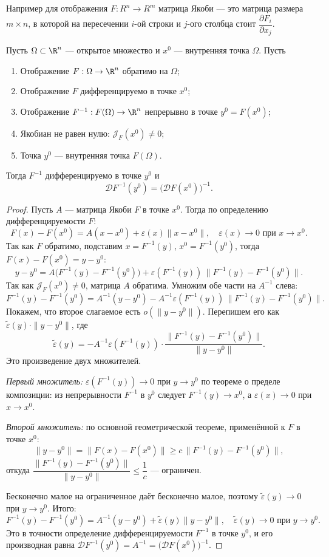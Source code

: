 \begin{note}
Например для отображения $F : R^n \to R^m$ матрица Якоби --- это матрица размера $m \times n$, в которой на пересечении $i$-ой строки и $j$-ого столбца стоит $\dfrac{\partial F_i}{\partial x_j}$.
\end{note}
\begin{theorem}
Пусть $\Omega \subset \R^n$ --- открытое множество и $x^0$ --- внутренняя точка $\Omega$. Пусть
\begin{enumerate}
  \item Отображение $F : \Omega \to \R^n$ обратимо на $\Omega$;
  \item Отображение $F$ дифференцируемо в точке $x^0$;
  \item Отображение $F^{-1} : F(\Omega) \to \R^n$ непрерывно в точке $y^0 = F(x^0)$;
  \item Якобиан не равен нулю: $\mathcal{J}_F(x^0) \neq 0$;
  \item Точка $y^0$ --- внутренняя точка $F(\Omega)$.
\end{enumerate}
Тогда $F^{-1}$ дифференцируемо в точке $y^0$ и
\[
  \mathcal{D}F^{-1}(y^0) = \bigl(\mathcal{D}F(x^0)\bigr)^{-1}.
\]
\begin{proof}
Пусть $A$ --- матрица Якоби $F$ в точке $x^0$. Тогда по определению
дифференцируемости $F$:
\[
  F(x) - F(x^0) = A(x - x^0) + \varepsilon(x)\|x - x^0\|,
  \quad \varepsilon(x) \to 0 \text{ при } x \to x^0.
\]
Так как $F$ обратимо, подставим $x = F^{-1}(y)$, $x^0 = F^{-1}(y^0)$,
тогда $F(x) - F(x^0) = y - y^0$:
\[
  y - y^0
  = A\bigl(F^{-1}(y) - F^{-1}(y^0)\bigr)
  + \varepsilon(F^{-1}(y))\,\|F^{-1}(y) - F^{-1}(y^0)\|.
\]
Так как $\mathcal{J}_F(x^0) \neq 0$, матрица $A$ обратима.
Умножим обе части на $A^{-1}$ слева:
\[
  F^{-1}(y) - F^{-1}(y^0)
  = A^{-1}(y - y^0)
  - A^{-1}\varepsilon(F^{-1}(y))\,\|F^{-1}(y) - F^{-1}(y^0)\|.
\]
Покажем, что второе слагаемое есть $o(\|y - y^0\|)$.
Перепишем его как $\tilde{\varepsilon}(y)\cdot\|y-y^0\|$, где
\[
  \tilde{\varepsilon}(y)
  = -A^{-1}\varepsilon(F^{-1}(y))\cdot
  \frac{\|F^{-1}(y) - F^{-1}(y^0)\|}{\|y - y^0\|}.
\]
Это произведение двух множителей.

\textit{Первый множитель:} $\varepsilon(F^{-1}(y)) \to 0$ при $y \to y^0$
по теореме о пределе композиции: из непрерывности $F^{-1}$ в $y^0$ следует
$F^{-1}(y) \to x^0$, а $\varepsilon(x) \to 0$ при $x \to x^0$.

\textit{Второй множитель:} по основной геометрической теореме,
применённой к $F$ в точке $x^0$:
\[
  \|y - y^0\| = \|F(x) - F(x^0)\| \geq c\,\|F^{-1}(y) - F^{-1}(y^0)\|,
\]
откуда $\dfrac{\|F^{-1}(y) - F^{-1}(y^0)\|}{\|y - y^0\|} \leq \dfrac{1}{c}$ --- ограничен.

Бесконечно малое на ограниченное даёт бесконечно малое,
поэтому $\tilde{\varepsilon}(y) \to 0$ при $y \to y^0$. Итого:
\[
  F^{-1}(y) - F^{-1}(y^0)
  = A^{-1}(y - y^0) + \tilde{\varepsilon}(y)\|y - y^0\|,
  \quad \tilde{\varepsilon}(y) \to 0 \text{ при } y \to y^0.
\]
Это в точности определение дифференцируемости $F^{-1}$ в точке $y^0$,
и его производная равна $\mathcal{D}F^{-1}(y^0) = A^{-1} = \bigl(\mathcal{D}F(x^0)\bigr)^{-1}$.
\end{proof}
\end{theorem}


